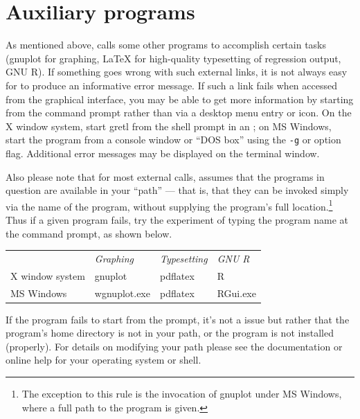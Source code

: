 \section{Auxiliary programs}
\label{trouble-programs}

As mentioned above,  calls some other programs to
accomplish certain tasks (gnuplot for graphing, {\LaTeX} for
high-quality typesetting of regression output, GNU R).  If something
goes wrong with such external links, it is not always easy for
 to produce an informative error message.  If such a link
fails when accessed from the  graphical interface, you may
be able to get more information by starting  from the
command prompt rather than via a desktop menu entry or icon.  On the X
window system, start gretl from the shell prompt in an ; on
MS Windows, start the program  from a console window
or ``DOS box'' using the \verb|-g| or  option flag.
Additional error messages may be displayed on the terminal window.

Also please note that for most external calls,  assumes
that the programs in question are available in your ``path'' --- that
is, that they can be invoked simply via the name of the program,
without supplying the program's full location.\footnote{The exception
  to this rule is the invocation of gnuplot under MS Windows, where a
  full path to the program is given.}  Thus if a given program fails,
try the experiment of typing the program name at the command prompt,
as shown below.

\begin{center}
  \begin{tabular}{llll}
    & \textit{Graphing} & \textit{Typesetting} & \textit{GNU R}\\
    X window system & gnuplot & pdflatex & R\\
    MS Windows & wgnuplot.exe & pdflatex & RGui.exe\\
  \end{tabular}
\end{center}

If the program fails to start from the prompt, it's not a 
issue but rather that the program's home directory is not in your
path, or the program is not installed (properly).  For details on
modifying your path please see the documentation or online help for
your operating system or shell.
    

